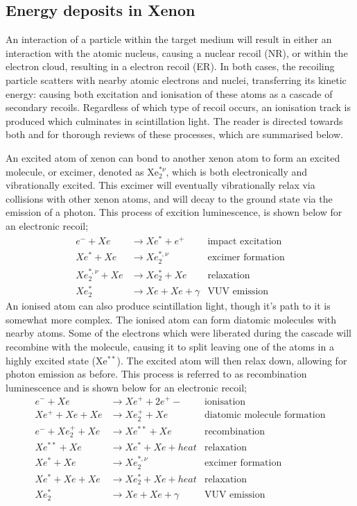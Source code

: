 \subsection{Energy deposits in Xenon}
\par
An interaction of a particle within the target medium will result in either an interaction with the atomic nucleus, causing a nuclear recoil (NR), or within the electron cloud, resulting in a electron recoil (ER).
In both cases, the recoiling particle scatters with nearby atomic electrons and nuclei, transferring its kinetic energy: causing both excitation and ionisation of these atoms as a cascade of secondary recoils.
Regardless of which type of recoil occurs, an ionisation track is produced which culminates in scintillation light.
The reader is directed towards both \cite{xenon_physics_ref} and \cite{carldahl_thesis_ref} for thorough reviews of these processes, which are summarised below.
\par
An excited atom of xenon can bond to another xenon atom to form an excited molecule, or excimer, denoted as Xe$_2^{*\nu}$, which is both electronically and vibrationally excited.
This excimer will eventually vibrationally relax via collisions with other xenon atoms, and will decay to the ground state via the emission of a photon.
This process of excition luminescence, is shown below for an electronic recoil;
\begin{align*}
    e^- + Xe &\rightarrow Xe^* + e^+  &\text{impact excitation} \\ 
    Xe^* + Xe &\rightarrow Xe_2^{*,\nu} &\text{excimer formation} \\
    Xe_2^{*,\nu} + Xe &\rightarrow Xe_2^* + Xe &\text{relaxation} \\
    Xe_2^* &\rightarrow Xe + Xe + \gamma &\text{VUV emission} 
\end{align*}
An ionised atom can also produce scintillation light, though it's path to it is somewhat more complex.
The ionised atom can form diatomic molecules with nearby atoms.
Some of the electrons which were liberated during the cascade will recombine with the molecule, causing it to split leaving one of the atoms in a highly excited state (Xe$^{**}$).
The excited atom will then relax down, allowing for photon emission as before.
This process is referred to as recombination luminescence and is shown below for an electronic recoil;
\begin{align*}
    e^- + Xe &\rightarrow Xe^+ + 2e^+- &\text{ionisation} \\ 
    Xe^+ + Xe + Xe &\rightarrow Xe_2^{+} + Xe &\text{diatomic molecule formation} \\
    e^- + Xe_2^+ + Xe&\rightarrow Xe^{**} + Xe &\text{recombination} \\
    Xe^{**} + Xe &\rightarrow Xe^{*} + Xe + heat &\text{relaxation} \\
    Xe^{*} + Xe  &\rightarrow Xe_2^{*,\nu} &\text{excimer formation} \\
    Xe^{*} + Xe + Xe &\rightarrow Xe_2^{*} + Xe + heat &\text{relaxation} \\
    Xe_2^* &\rightarrow Xe + Xe + \gamma &\text{VUV emission} 
\end{align*}
